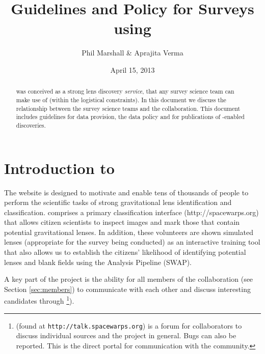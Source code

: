 \documentclass[a4paper]{article}
\begin{document}
             
\title{Guidelines and Policy for Surveys using \SW}
\author{Phil Marshall \& Aprajita Verma}
\date{April 15, 2013}
\maketitle


\begin{abstract} 
\noindent \sw was conceived as a strong lens
discovery {\it service}, that any survey science team can make use of
(within the logistical constraints). In this document we discuss the relationship
between the survey science teams and the \sw collaboration. 
This document includes guidelines for data provision, the data policy and for publications of \sw-enabled discoveries.
\end{abstract}

\setcounter{footnote}{0}


\section{Introduction to \sw}

The \sw website is designed to motivate and  enable tens of thousands of
people to perform the scientific tasks of strong gravitational lens
identification and classification.  \sw comprises a primary classification interface (http://spacewarps.org) that allows citizen scientists to inspect images and mark those that contain potential gravitational lenses. In addition, these volunteers are shown simulated lenses (appropriate for the survey being conducted) as an interactive training tool that also allows us to establish the citizens' likelihood of identifying potential lenses and blank fields using the \sw Analysis Pipeline (SWAP). 

A key part of the \sw project is the ability for all members of the \sw collaboration (see Section \ref{sec:members}) to communicate with each other and discuss interesting candidates through \Talk\footnote{\Talk (found at \texttt{http://talk.spacewarps.org}) is a forum for \sw collaborators to discuss individual sources and the \sw project in general. Bugs can also be reported. This is the direct portal for communication with the \sw community.}).
\end{document}
